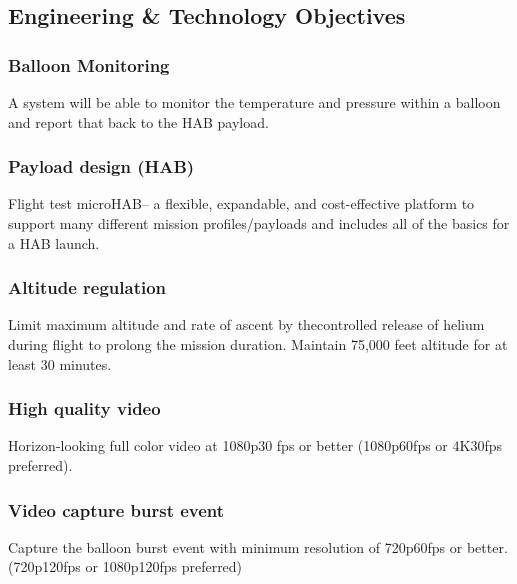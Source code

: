 
\subsection{Engineering \& Technology Objectives}
\subsubsection{Balloon Monitoring}
A system will be able to monitor the temperature and pressure within a balloon
and report that back to the HAB payload.


\subsubsection{Payload design (\textmu HAB)}
Flight test microHAB-- a flexible, expandable, and cost-effective platform to
support many different mission profiles/payloads and includes all of the basics
for a HAB launch. 

\subsubsection{Altitude regulation}
Limit maximum altitude and rate of ascent by thecontrolled release of helium
during flight to prolong the mission duration. Maintain 75,000 feet altitude
for at least 30 minutes. 

\subsubsection{High quality video}
Horizon-looking full color video at 1080p\@30 fps or better (1080p\@60fps or
4K\@30fps preferred).

\subsubsection{Video capture burst event}
Capture the balloon burst event with minimum resolution of 720p\@60fps or 
better. (720p\@120fps or 1080p\@120fps preferred)


